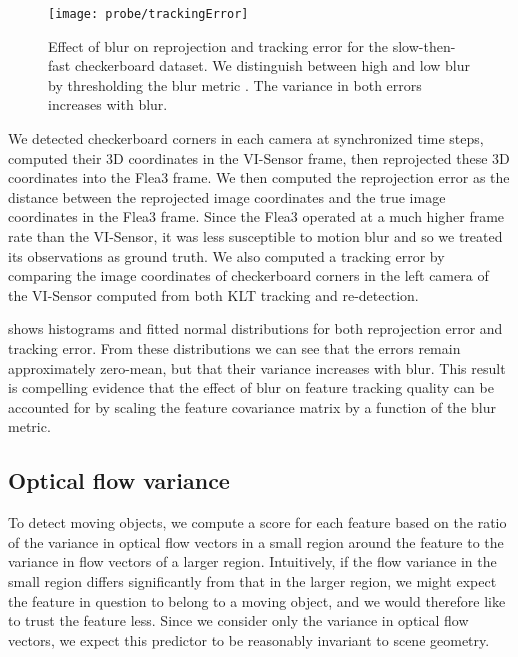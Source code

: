 \begin{figure}
    \centering
    \texttt{[image: probe/trackingError]}
    \label{fig:probe_visensor_trackingError}
    \caption{Effect of blur on reprojection and tracking error for the slow-then-fast checkerboard dataset. We distinguish between high and low blur by thresholding the blur metric \cite{crete2007blur}. The variance in both errors increases with blur.}
    \label{fig:probe_visensor_histograms}
\end{figure}

We detected checkerboard corners in each camera at synchronized time steps, computed their 3D coordinates in the VI-Sensor frame, then reprojected these 3D coordinates into the Flea3 frame.
We then computed the reprojection error as the distance between the reprojected image coordinates and the true image coordinates in the Flea3 frame.
Since the Flea3 operated at a much higher frame rate than the VI-Sensor, it was less susceptible to motion blur and so we treated its observations as ground truth.
We also computed a tracking error by comparing the image coordinates of checkerboard corners in the left camera of the VI-Sensor computed from both KLT tracking \cite{Lucas:1981} and re-detection.

 shows histograms and fitted normal distributions for both reprojection error and tracking error.
From these distributions we can see that the errors remain approximately zero-mean, but that their variance increases with blur.
This result is compelling evidence that the effect of blur on feature tracking quality can be accounted for by scaling the feature covariance matrix by a function of the blur metric.


\subsection{Optical flow variance}
To detect moving objects, we compute a score for each feature based on the ratio of the variance in optical flow vectors in a small region around the feature to the variance in flow vectors of a larger region.
Intuitively, if the flow variance in the small region differs significantly from that in the larger region, we might expect the feature in question to belong to a moving object, and we would therefore like to trust the feature less.
Since we consider only the variance in optical flow vectors, we expect this predictor to be reasonably invariant to scene geometry.

